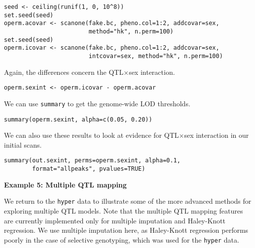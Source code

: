\documentclass[10pt,letterpaper]{article}
\newcommand{\usercolor}{\color [named]{BlueViolet}}
\begin{document}
\begin{enumerate}
\usercolor
\verb|seed <- ceiling(runif(1, 0, 10^8))| \\
\verb|set.seed(seed)| \\
\verb|operm.acovar <- scanone(fake.bc, pheno.col=1:2, addcovar=sex,| \\
\verb|                        method="hk", n.perm=100)| \\
\verb|set.seed(seed)| \\
\verb|operm.icovar <- scanone(fake.bc, pheno.col=1:2, addcovar=sex,| \\
\verb|                        intcovar=sex, method="hk", n.perm=100)|
\normalcolor

Again, the differences concern the QTL$\times$sex interaction.

\usercolor
\verb|operm.sexint <- operm.icovar - operm.acovar|
\normalcolor

We can use \verb-summary- to get the genome-wide LOD thresholds.

\usercolor
\verb|summary(operm.sexint, alpha=c(0.05, 0.20))|
\normalcolor

We can also use these results to look at evidence for QTL$\times$sex
interaction in our initial scans.

\usercolor
\verb|summary(out.sexint, perms=operm.sexint, alpha=0.1,| \\
\verb|        format="allpeaks", pvalues=TRUE)|
\normalcolor


\end{enumerate}


\newpage
\noindent \textbf{Example 5: Multiple QTL mapping} \vspace{6pt}
\nopagebreak

\label{example5}

We return to the \verb-hyper- data to illustrate some of the more
advanced methods for exploring multiple QTL models.  Note that the
multiple QTL mapping features are currently implemented only for
multiple imputation and Haley-Knott regression.  We use multiple
imputation here, as Haley-Knott regression performs poorly in the case
of selective genotyping, which was used for the \verb-hyper- data.
\end{document}
